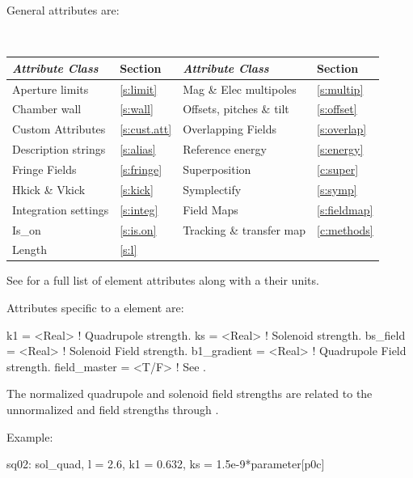 {General  attributes are:
\begin{center}
\tt
\begin{tabular}{llll} \toprule
  {\sl Attribute Class}      & Section           & {\sl Attribute Class}      & Section            \\ \midrule
  Aperture limits            & \ref{s:limit}     & Mag \& Elec multipoles     & \ref{s:multip}     \\
  Chamber wall               & \ref{s:wall}      & Offsets, pitches \& tilt   & \ref{s:offset}     \\
  Custom Attributes          & \ref{s:cust.att}  & Overlapping Fields         & \ref{s:overlap}    \\
  Description strings        & \ref{s:alias}     & Reference energy           & \ref{s:energy}     \\ 
  Fringe Fields              & \ref{s:fringe}    & Superposition              & \ref{c:super}      \\
  Hkick \& Vkick             & \ref{s:kick}      & Symplectify                & \ref{s:symp}       \\
  Integration settings       & \ref{s:integ}     & Field Maps                 & \ref{s:fieldmap}   \\
  Is_on                      & \ref{s:is.on}     & Tracking \& transfer map   & \ref{c:methods}    \\ 
  Length                     & \ref{s:l}         &                            &                    \\ 
  \bottomrule
\end{tabular}
\end{center}
\toffset
See  for a full list of element attributes along with a their units.

Attributes specific to a  element are:
\begin{example}
  k1           = <Real>    ! Quadrupole strength.
  ks           = <Real>    ! Solenoid strength.
  bs_field     = <Real>    ! Solenoid Field strength.
  b1_gradient  = <Real>    ! Quadrupole Field strength.
  field_master = <T/F>     ! See .
\end{example}
The normalized quadrupole  and solenoid  field strengths are related to the
unnormalized  and  field strengths through .

Example:
\begin{example}
  sq02: sol_quad, l = 2.6, k1 = 0.632, ks = 1.5e-9*parameter[p0c]
\end{example}

}
